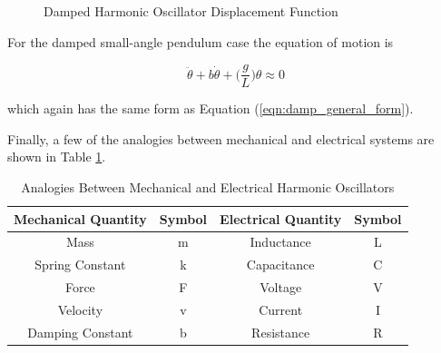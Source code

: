 \documentclass{article}
\theoremstyle{definition}
\begin{document}
\medskip
\bigskip
\begin{figure}[H]
  \caption{Damped Harmonic Oscillator Displacement Function \cite{damped_harmonic_oscillator}}
  \label{fig:critically_damped_harmonic_oscillator}
\end{figure}

\bigskip
\noindent
For the damped small-angle pendulum case the equation of motion is

\medskip
\begin{equation}
\ddot{\theta} + b \dot{\theta} + \bigg (\dfrac{g}{L} \bigg ) \theta \approx 0
\label{eqn:damped_pendulum}
\end{equation}

\medskip
\noindent
which again has the same form as Equation (\ref{eqn:damp_general_form}).

\bigskip
\noindent
Finally, a few of the analogies between mechanical
and electrical systems are shown in Table \ref{tab:analogies}.


\bigskip
\begin{table} [H]
  \centering
  \renewcommand{\arraystretch}{2.0}
     \resizebox{0.90 \textwidth}{!} {																	%
     \begin{tabular} {| c | c  | c | c |}
      \hline
      {\Large \bf Mechanical Quantity}  & {\Large \bf Symbol} & {\Large \bf Electrical Quantity} & {\Large \bf Symbol}\\
      \hline \hline
      Mass & m & Inductance & L\\
      \hline
      Spring Constant & k & Capacitance & C \\
      \hline
      Force & F & Voltage & V \\
      \hline
      Velocity & v & Current & I \\
      \hline
      Damping Constant & b & Resistance & R \\
      \hline
    \end{tabular}
   }
  \caption{Analogies Between Mechanical and Electrical Harmonic Oscillators}
  \label{tab:analogies}
\end{table}
\end{document}
